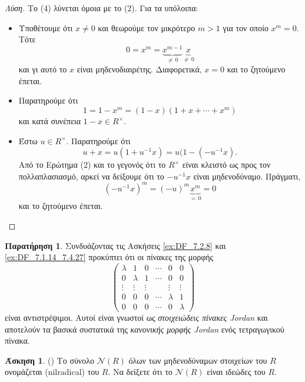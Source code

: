 \documentclass[12pt,a4paper,reqno]{amsart}
\theoremstyle{definition}
\newtheorem{exercise}{Άσκηση}
\newtheorem*{remark}{Παρατήρηση}
\newcommand{\nN}{\mathcal{N}}
\newcommand{\defn}[1]{{\color{mylightblue}{#1}}}
\begin{document}
\begin{proof}[Λύση]
  Το (4) λύνεται όμοια με το (2). Για τα υπόλοιπα:
  \begin{itemize}
    \item[(1)] Υποθέτουμε ότι $x \neq 0$ και θεωρούμε τον μικρότερο $m > 1$ για τον οποίο $x^m = 0$. Τότε 
    \[
    0 = x^m = \underbrace{x^{m-1}}_{\neq \, 0} \underbrace{x}_{\neq \, 0}
    \]
    και γι αυτό το $x$ είναι μηδενοδιαιρέτης. Διαφορετικά, $x=0$ και το ζητούμενο έπεται.
    \item[(2)] Παρατηρούμε ότι 
    \[
    1 = 1-x^m = (1-x)(1+x+\cdots + x^m)
    \]
    και κατά συνέπεια $1-x \in R^\times$.
    \item[(3)] Έστω $u \in R^\times$. Παρατηρούμε ότι 
    \[
    u + x = u(1 + u^{-1}x) = u(1 - (-u^{-1}x).
    \]
    Από το Ερώτημα (2) και το γεγονός ότι το $R^\times$ είναι κλειστό ως προς τον πολλαπλασιασμό, αρκεί να δείξουμε ότι το $-u^{-1}x$ είναι μηδενοδύναμο. Πράγματι,
    \[
    (-u^{-1}x)^m = (-u)^m\underbrace{x^m}_{=\,0} = 0
    \]
    και το ζητούμενο έπεται.
  \end{itemize}
\end{proof}

\begin{remark}
  Συνδυάζοντας τις Ασκήσεις \ref{ex:DF_7.2.8} και \ref{ex:DF_7.1.14_7.4.27} προκύπτει ότι οι πίνακες της μορφής 
  \[
  \begin{pmatrix}
    \lambda & 1       & 0      & \cdots & 0       & 0 \\
    0       & \lambda & 1      & \cdots & 0       & 0 \\
    \vdots  & \vdots  & \vdots &        & \vdots  & \vdots\\
    0       & 0       & 0      & \cdots & \lambda & 1 \\
    0       & 0       & 0      & \cdots & 0       & \lambda
  \end{pmatrix}
  \]
  είναι αντιστρέψιμοι. Αυτοί είναι γνωστοί ως \emph{στοιχειώδεις πίνακες Jordan} και αποτελούν τα βασικά συστατικά της \emph{κανονικής μορφής Jordan} ενός τετραγωγικού πίνακα.
\end{remark}

\begin{exercise}{\rm(\cite[Άσκηση~7.3.29]{DF04})}
  \label{ex:DF_7.3.29}
  Το σύνολο $\nN(R)$ όλων των μηδενοδύναμων στοιχείων του $R$ ονομάζεται \defn{μηδενοριζικό} (nilradical) του $R$. Να δείξετε ότι το $\nN(R)$ είναι ιδεώδες του $R$.
\end{exercise}
\end{document}
